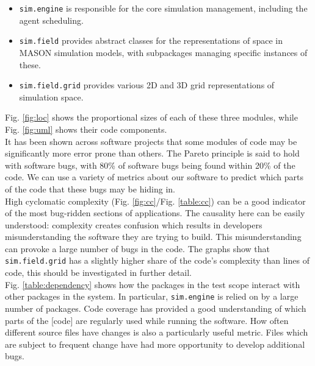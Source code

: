 \documentclass[11pt]{article}
\begin{document}
\begin{itemize}
\item \texttt{sim.engine} is responsible for the core simulation management, including the agent scheduling.
\item \texttt{sim.field} provides abstract classes for the representations of space in MASON simulation models, with subpackages managing specific instances of these.
\item \texttt{sim.field.grid} provides various 2D and 3D grid representations of simulation space.
\end{itemize}

Fig. \ref{fig:loc} shows the proportional sizes of each of these three modules, while Fig. \ref{fig:uml} shows their code components.
\\

It has been shown across software projects that some modules of code may be significantly more error prone than others.
The Pareto principle is said to hold with software bugs, with 80\% of software bugs being found within 20\% of the code\cite[pp. 124]{pressman}.
We can use a variety of metrics about our software to predict which parts of the code that these bugs may be hiding in\cite{predicting_from_history}.
\\

High cyclomatic complexity (Fig. \ref{fig:cc}/Fig. \ref{table:cc}) can be a good indicator of the most bug-ridden sections of applications.
The causality here can be easily understood: complexity creates confusion which results in developers misunderstanding the software they are trying to build.
This misunderstanding can provoke a large number of bugs in the code.
The graphs show that \texttt{sim.field.grid} has a slightly higher share of the code's complexity than lines of code, this should be investigated in further detail.
\\

Fig. \ref{table:dependency} shows how the packages in the test scope interact with other packages in the system. In particular, \texttt{sim.engine} is relied on by a large number of packages.
Code coverage has provided a good understanding of which parts of the [code] are regularly used while running the software.
How often different source files have changes is also a particularly useful metric. Files which are subject to frequent change have had more opportunity to develop additional bugs.
\\
\end{document}
